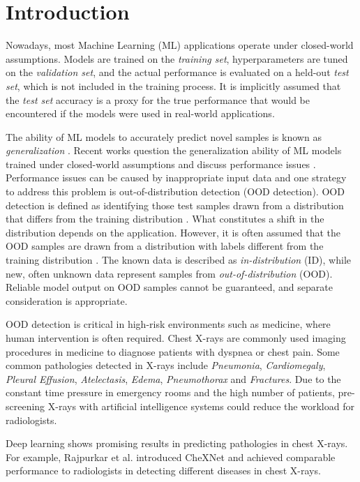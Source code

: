 \section{Introduction}
\raggedbottom
Nowadays, most Machine Learning (ML) applications operate under closed-world assumptions.
Models are trained on the \textit{training set}, hyperparameters are tuned on the \textit{validation set}, and the actual performance is evaluated on a held-out \textit{test set}, which is not included in the training process.
It is implicitly assumed that the \textit{test set} accuracy is a proxy for the true performance that would be encountered if the models were used in real-world applications.
\par
The ability of ML models to accurately predict novel samples is known as \textit{generalization} \citep{Bishop2006}.
Recent works question the generalization ability of ML models trained under closed-world assumptions and discuss performance issues \citep{Recht2018,Zech2018}.
Performance issues can be caused by inappropriate input data and one strategy to address this problem is out-of-distribution detection (OOD detection).
OOD detection is defined as identifying those test samples drawn from a distribution that differs from the training distribution \citep{Yang2021}.
What constitutes a shift in the distribution depends on the application.
However, it is often assumed that the OOD samples are drawn from a distribution with labels different from the training distribution \citep{Yang2021}.
The known data is described as \textit{in-distribution} (ID), while new, often unknown data represent samples from \textit{out-of-distribution} (OOD).
Reliable model output on OOD samples cannot be guaranteed, and separate consideration is appropriate.
\par
OOD detection is critical in high-risk environments such as medicine, where human intervention is often required.
Chest X-rays are commonly used imaging procedures in medicine to diagnose patients with dyspnea or chest pain.
Some common pathologies detected in X-rays include \textit{Pneumonia}, \textit{Cardiomegaly}, \textit{Pleural Effusion}, \textit{Atelectasis}, \textit{Edema}, \textit{Pneumothorax} and \textit{Fractures}.
Due to the constant time pressure in emergency rooms and the high number of patients, pre-screening X-rays with artificial intelligence systems could reduce the workload for radiologists. 
\par
Deep learning shows promising results in predicting pathologies in chest X-rays.
For example, Rajpurkar et al. \citep{Rajpurkar2017} introduced CheXNet and achieved comparable performance to radiologists in detecting different diseases in chest X-rays.
